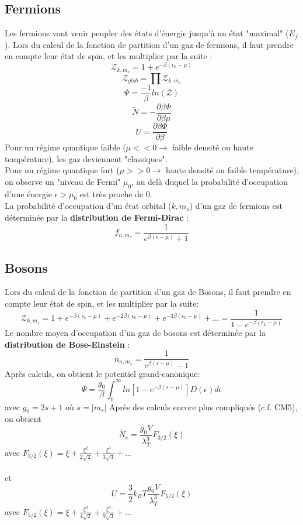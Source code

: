 \documentclass{article}
\begin{document}
    \subsection{Fermions}
        Les fermions vont venir peupler des états d'énergie jusqu'à un état "maximal" ($E_f$).
        Lors du calcul de la fonction de partition d'un gaz de fermions, il faut prendre en compte leur état de spin, et les multiplier par la suite :
        $$
        \mathcal{Z}_{k,m_s} = 1 + e^{-\beta (\epsilon_k - \mu)}
        $$
        $$
        \mathcal{Z}_{glob} = \prod \mathcal{Z}_{k, m_s}
        $$
        $$
        \Psi = \frac{-1}{\beta} ln(\mathcal{Z})
        $$
        $$
        \tilde N = - \frac{\partial \beta \Phi}{\partial \beta \mu}
        $$
        $$
        U = \frac{\partial \beta \Phi}{\partial \beta}
        $$
        Pour un régime quantique faible ($\mu << 0 \rightarrow$ faible densité ou haute température), les gaz deviennent "classiques".\\
        Pour un régime quantique fort ($\mu >> 0 \rightarrow$ haute densité ou faible température), on observe un "niveau de Fermi" $\mu_0$, au delà duquel la probabilité d'occupation d'une énergie $\epsilon > \mu_0$ est très proche de 0.\\
        La probabilité d'occupation d'un état orbital ($k, m_s$) d'un gaz de fermions est déterminée par la \textbf{distribution de Fermi-Dirac} :
        $$
        f_{n,m_s} = \frac{1}{e^{\beta (\epsilon - \mu)} + 1}
        $$

    \subsection{Bosons}
        Lors du calcul de la fonction de partition d'un gaz de Bosons, il faut prendre en compte leur état de spin, et les multiplier par la suite:
        $$
        \mathcal{Z}_{k,m_s} = 1 + e^{-\beta (\epsilon_k - \mu)} + e^{-2\beta (\epsilon_k - \mu)} + e^{-3\beta (\epsilon_k - \mu)} + ... = \frac{1}{1-e^{-\beta (\epsilon_k - \mu)}}
        $$
        Le nombre moyen d'occupation d'un gaz de bosons est déterminée par la \textbf{distribution de Bose-Einstein} :
        $$
        \overline{n}_{n,m_s} = \frac{1}{e^{\beta (\epsilon - \mu)} - 1}
        $$
        Après calculs, on obtient le potentiel grand-canonique:
        $$
        \Psi = \frac{g_0}{\beta} \int_{0}^{\infty} ln[1 - e^{-\beta(\epsilon-\mu)}] D(\epsilon) d\epsilon
        $$
        avec $g_0 = 2s +1$ où $s = |m_s|$
\pagebreak
        Après des calculs encore plus compliqués (c.f. CM5), on obtient
        $$
        \tilde N_e = \frac{g_0 V}{\lambda_T^3} F_{3/2}(\xi)
        $$
        avec $F_{3/2}(\xi) = \xi + \frac{\xi^2}{2\sqrt{2}} + \frac{\xi^3}{3\sqrt{3}} + ...$\\\\
        et
        $$
        U = \frac{3}{2} k_B T \frac{g_0 V}{\lambda_T^3} F_{5/2}(\xi)
        $$
        avec $F_{5/2}(\xi) = \xi + \frac{\xi^2}{4\sqrt{2}} + \frac{\xi^3}{9\sqrt{3}} + ...$
\pagebreak
\end{document}
